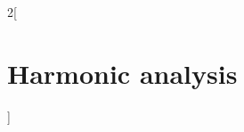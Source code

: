 \documentclass[../../../main_math.tex]{subfiles}
\begin{document}
\begin{multicols}{2}[\section{Harmonic analysis}]

\end{multicols}
\end{document}
